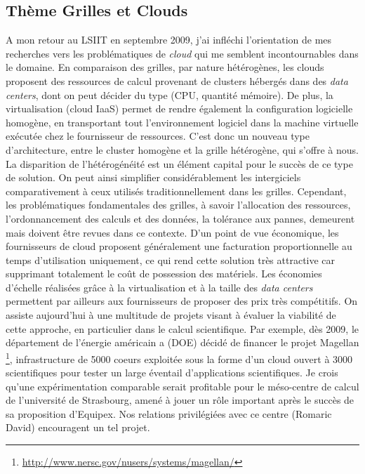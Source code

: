 \documentclass[11pt]{article}
\begin{document}
\subsection*{Thème Grilles et Clouds}

A mon retour au LSIIT en septembre 2009, j'ai infléchi l'orientation de 
mes recherches vers les problématiques de \emph{cloud} qui me semblent 
incontournables dans le domaine. En comparaison des grilles, par nature
hétérogènes, les clouds proposent des ressources de calcul provenant
de clusters hébergés dans des \textit{data centers}, dont on peut décider 
du type (CPU, quantité mémoire).  De plus, la virtualisation (cloud IaaS) 
permet de rendre également la configuration logicielle homogène, en 
transportant tout l'environnement logiciel dans la machine virtuelle exécutée 
chez le fournisseur de ressources. C'est donc un nouveau type d'architecture, 
entre le cluster homogène et la grille hétérogène, qui s'offre à nous. 
La disparition de l'hétérogénéité est un élément capital pour le succès
de ce type de solution. On peut ainsi simplifier considérablement les 
intergiciels comparativement à ceux utilisés traditionnellement dans les 
grilles. Cependant, les problématiques fondamentales des grilles, à
savoir l'allocation des ressources, l'ordonnancement des calculs et des
données, la tolérance aux pannes, demeurent mais doivent être revues 
dans ce contexte.
D'un point de vue économique, les fournisseurs de cloud proposent 
généralement une facturation proportionnelle au temps d'utilisation 
uniquement, ce qui rend cette solution très attractive car supprimant
totalement le coût de possession des matériels. Les économies d'échelle
réalisées grâce à la virtualisation et à la taille des \textit{data centers}
permettent par ailleurs aux fournisseurs de proposer des prix très 
compétitifs.  On assiste aujourd'hui à une multitude de projets visant 
à évaluer la viabilité de cette approche, en particulier dans le calcul 
scientifique. Par exemple, dès 2009, le département de l'énergie américain 
a (DOE) décidé de financer le projet Magellan%
\footnote{\url{http://www.nersc.gov/nusers/systems/magellan/}},
infrastructure de 5000 coeurs exploitée sous la forme d'un cloud
ouvert à 3000 scientifiques pour tester un large éventail 
d'applications scientifiques. Je crois qu'une expérimentation comparable
serait profitable pour le méso-centre de calcul de l'université de
Strasbourg, amené à jouer un rôle important après le succès de sa 
proposition d'Equipex. Nos relations privilégiées avec ce centre (Romaric 
David) encouragent un tel projet.\\
\end{document}
